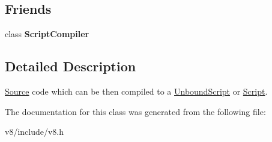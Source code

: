 \subsection*{Friends}
\begin{DoxyCompactItemize}
\item 
\mbox{\label{classv8_1_1ScriptCompiler_1_1Source_a1cb50af99960b4c11eaee7347e034f51}} 
class {\bfseries Script\+Compiler}
\end{DoxyCompactItemize}


\subsection{Detailed Description}
\mbox{\hyperlink{classv8_1_1ScriptCompiler_1_1Source}{Source}} code which can be then compiled to a \mbox{\hyperlink{classv8_1_1UnboundScript}{Unbound\+Script}} or \mbox{\hyperlink{classv8_1_1Script}{Script}}. 

The documentation for this class was generated from the following file\+:\begin{DoxyCompactItemize}
\item 
v8/include/v8.\+h\end{DoxyCompactItemize}
